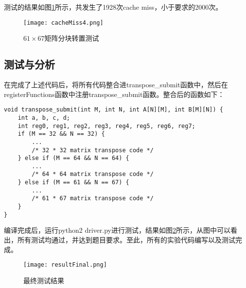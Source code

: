\par 测试的结果如图\ref{fig:cacheMiss4}所示，共发生了1928次cache miss，小于要求的2000次。
\begin{figure}[htb]
    \centering
    \texttt{[image: cacheMiss4.png]}
    \caption{$61\times 67$矩阵分块转置测试}
    \label{fig:cacheMiss4}
\end{figure}

\subsection{测试与分析}
\label{sub2:ce_shi_yu_fen_xi_}
\par 在完成了上述代码后，将所有代码整合进transpose\_submit函数中，然后在registerFunctions函数中注册transpose\_submit函数。整合后的函数如下：
\begin{lstlisting}
void transpose_submit(int M, int N, int A[N][M], int B[M][N]) {
    int a, b, c, d;
    int reg0, reg1, reg2, reg3, reg4, reg5, reg6, reg7;
    if (M == 32 && N == 32) {
        ...
        /* 32 * 32 matrix transpose code */
    } else if (M == 64 && N == 64) {
        ...
        /* 64 * 64 matrix transpose code */
    } else if (M == 61 && N == 67) {
        ...
        /* 61 * 67 matrix transpose code */
    }
}
\end{lstlisting}

\par 编译完成后，运行python2 driver.py进行测试，结果如图\ref{fig:resultFinal}所示，从图中可以看出，所有测试均通过，并达到题目要求。至此，所有的实验代码编写以及测试完成。
\begin{figure}[htb]
    \centering
    \texttt{[image: resultFinal.png]}
    \caption{最终测试结果}
    \label{fig:resultFinal}
\end{figure}



